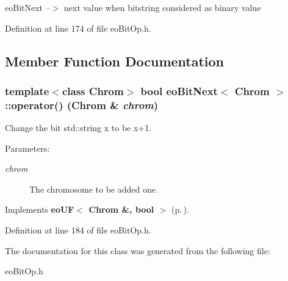 eo\-Bit\-Next --$>$ next value when bitstring considered as binary value 



Definition at line 174 of file eo\-Bit\-Op.h.

\subsection{Member Function Documentation}
\subsubsection{\setlength{\rightskip}{0pt plus 5cm}template$<$class Chrom$>$ bool {\bf eo\-Bit\-Next}$<$ Chrom $>$::operator() (Chrom \& {\em chrom})\hspace{0.3cm}{\tt  [inline, virtual]}}\label{classeo_bit_next_a1}


Change the bit std::string x to be x+1. 

\begin{Desc}
\item[Parameters:]
\begin{description}
\item[{\em chrom}]The chromosome to be added one. \end{description}
\end{Desc}


Implements {\bf eo\-UF$<$ Chrom \&, bool $>$} {\rm (p.\,\pageref{classeo_u_f_a1})}.

Definition at line 184 of file eo\-Bit\-Op.h.

The documentation for this class was generated from the following file:\begin{CompactItemize}
\item 
eo\-Bit\-Op.h\end{CompactItemize}
